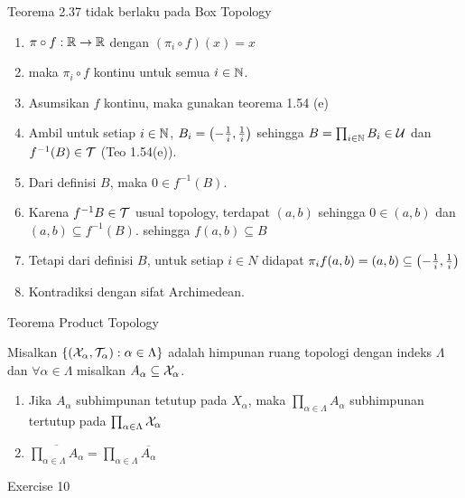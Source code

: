 \begin{frame}{Teorema 2.37 tidak berlaku pada Box Topology}
    \begin{tcolorbox}[enhanced,title=Contoh 11 (Analisa), frame style tile={width=\paperwidth}{\wallpaper}]
        \begin{enumerate}
            \item $\pi\circ f:\R \to \R$ dengan $(\pi_i\circ f)(x)=x$
            \item maka $\pi_i\circ f$ kontinu untuk semua $i\in\N$.
            \item Asumsikan $f$ kontinu, maka gunakan teorema 1.54 (e)
            \item Ambil untuk setiap $i\in\N$, $B_i=\oio*{-\frac{1}{i},\frac{1}{i}}$ sehingga
            $B=\prod_{i\in\N}B_i \in \nU$ dan $f^{-1}(B)\in \nT$ (Teo 1.54(e)).
            \item Dari definisi $B$, maka $0\in f^{-1}(B)$.
            \item Karena $f^{-1}B\in \nT$ usual topology, terdapat $(a,b)$ sehingga
            $0\in(a,b)$ dan $(a,b)\subseteq f^{-1}(B)$.
            sehingga $f(a,b)\subseteq B$
            \item Tetapi dari definisi $B$, untuk setiap $i\in N$ didapat 
            $\pi_i{f(a,b)}=(a,b)\subseteq \oio*{-\frac{1}{i},\frac{1}{i}}$
            \item Kontradiksi dengan sifat Archimedean.
        \end{enumerate}
    \end{tcolorbox}
\end{frame}

\begin{frame}{Teorema Product Topology}
    \begin{tcolorbox}[enhanced,title=Teorema 2.38, frame style tile={width=\paperwidth}{\wallpaper}]
        Misalkan $\set*{\oio*{\nX_\alpha,\nT_\alpha}:\alpha \in \Lambda}$ adalah himpunan ruang topologi
        dengan indeks $\Lambda$ dan $\forall \alpha \in \Lambda$ misalkan $A_\alpha \subseteq \nX_\alpha$.
        \begin{enumerate}
            \item Jika $A_\alpha$ subhimpunan tetutup pada $X_\alpha$, maka $\prod_{\alpha \in \Lambda}A_\alpha$ subhimpunan tertutup pada $\prod_{\alpha \in \Lambda}\nX_\alpha$
            \item $\overline{\prod_{\alpha \in \Lambda}A_\alpha} = \prod_{\alpha \in \Lambda}\overline{A_\alpha}$
        \end{enumerate}
    \end{tcolorbox}
    \begin{tcolorbox}[enhanced,title=Teorema 2.38 (Bukti), frame style tile={width=\paperwidth}{\wallpaper}]
        Exercise 10
    \end{tcolorbox}
\end{frame}

